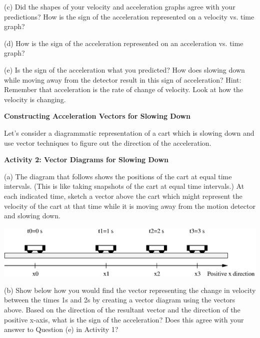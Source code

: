 (c) Did the shapes of your velocity and acceleration graphs agree with your
predictions? How is the sign of the acceleration represented on a velocity vs.
time graph? 
\vspace{20mm}

(d) How is the sign of the acceleration represented on an acceleration vs. time
graph? 
\vspace{20mm}

(e) Is the sign of the acceleration what you predicted? How does slowing down
while moving away from the detector result in this sign of acceleration? Hint:
Remember that acceleration is the rate of change of velocity. Look at how the
velocity is changing.
\vspace{20mm}

\textbf{Constructing Acceleration Vectors for Slowing Down }

Let's consider a diagrammatic representation of a cart which is slowing down
and use vector techniques to figure out the direction of the acceleration.

\textbf{Activity 2: Vector Diagrams for Slowing Down} 

(a) The diagram that follows shows the positions of the cart at equal time intervals.
(This is like taking snapshots of the cart at equal time intervals.) At each
indicated time, sketch a vector above the cart which might represent the velocity
of the cart at that time while it is moving away from the motion detector and
slowing down.

\vspace{0.3cm}
{\par\centering \includegraphics{slowing/slowing_fig2.eps} \par}
\vspace{0.3cm}

(b) Show below how you would find the vector representing the change in velocity
between the times 1s and 2s by creating a vector diagram using the vectors 
 above. Based on the direction of the resultant vector and the direction of 
the positive x-axis, what is the sign of the acceleration? 
Does this agree with your answer to Question (e) in Activity 1?
\vspace{20mm}

